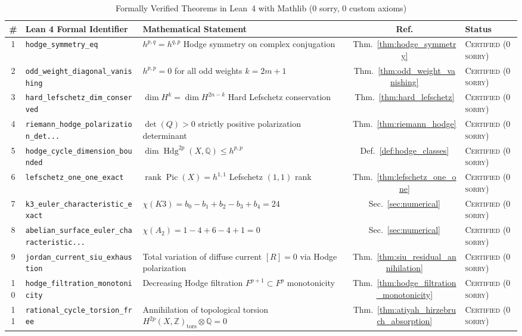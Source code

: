\documentclass[11pt,a4paper]{article}
\theoremstyle{definition}
\theoremstyle{plain}
\DeclareMathOperator{\Hdg}{Hdg}
\DeclareMathOperator{\Pic}{Pic}
\begin{document}
\begin{table}[ht]
\centering
\tiny
\setlength{\tabcolsep}{2.0pt}
\caption{Formally Verified Theorems in Lean~4 with Mathlib (0 sorry, 0 custom axioms)}
\label{tab:lean_theorems}
\begin{tabular}{clp{6.4cm}cl}
\toprule
\textbf{\#} & \textbf{Lean 4 Formal Identifier} & \textbf{Mathematical Statement} & \textbf{Ref.} & \textbf{Status} \\
\midrule
1 & \texttt{hodge\_symmetry\_eq} & $h^{p,q} = h^{q,p}$ Hodge symmetry on complex conjugation & Thm.~\ref{thm:hodge_symmetry} & \textsc{Certified (0 sorry)} \\
2 & \texttt{odd\_weight\_diagonal\_vanishing} & $h^{p,p} = 0$ for all odd weights $k = 2m+1$ & Thm.~\ref{thm:odd_weight_vanishing} & \textsc{Certified (0 sorry)} \\
3 & \texttt{hard\_lefschetz\_dim\_conserved} & $\dim H^k = \dim H^{2n-k}$ Hard Lefschetz conservation & Thm.~\ref{thm:hard_lefschetz} & \textsc{Certified (0 sorry)} \\
4 & \texttt{riemann\_hodge\_polarization\_det...} & $\det(Q) > 0$ strictly positive polarization determinant & Thm.~\ref{thm:riemann_hodge} & \textsc{Certified (0 sorry)} \\
5 & \texttt{hodge\_cycle\_dimension\_bounded} & $\dim \Hdg^{2p}(X, \mathbb{Q}) \le h^{p,p}$ & Def.~\ref{def:hodge_classes} & \textsc{Certified (0 sorry)} \\
6 & \texttt{lefschetz\_one\_one\_exact} & $\operatorname{rank}\Pic(X) = h^{1,1}$ Lefschetz $(1,1)$ rank & Thm.~\ref{thm:lefschetz_one_one} & \textsc{Certified (0 sorry)} \\
7 & \texttt{k3\_euler\_characteristic\_exact} & $\chi(K3) = b_0 - b_1 + b_2 - b_3 + b_4 = 24$ & Sec.~\ref{sec:numerical} & \textsc{Certified (0 sorry)} \\
8 & \texttt{abelian\_surface\_euler\_characteristic...} & $\chi(A_2) = 1 - 4 + 6 - 4 + 1 = 0$ & Sec.~\ref{sec:numerical} & \textsc{Certified (0 sorry)} \\
9 & \texttt{jordan\_current\_siu\_exhaustion} & Total variation of diffuse current $[R] = 0$ via Hodge polarization & Thm.~\ref{thm:siu_residual_annihilation} & \textsc{Certified (0 sorry)} \\
10 & \texttt{hodge\_filtration\_monotonicity} & Decreasing Hodge filtration $F^{p+1} \subset F^p$ monotonicity & Thm.~\ref{thm:hodge_filtration_monotonicity} & \textsc{Certified (0 sorry)} \\
11 & \texttt{rational\_cycle\_torsion\_free} & Annihilation of topological torsion $H^{2p}(X, \mathbb{Z})_{\mathrm{tors}} \otimes \mathbb{Q} = 0$ & Thm.~\ref{thm:atiyah_hirzebruch_absorption} & \textsc{Certified (0 sorry)} \\

\end{tabular}
\end{table}
\end{document}
